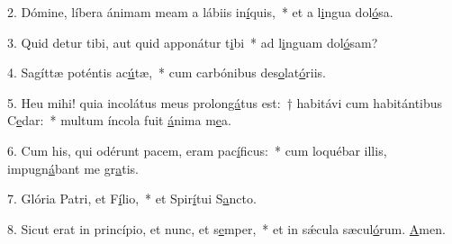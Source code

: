 2. Dómine, líbera ánimam meam a lábiis in\uline{í}quis,~* et a l\uline{i}ngua dol\uline{ó}sa.\par 
3. Quid detur tibi, aut quid apponátur t\uline{i}bi~* ad l\uline{i}nguam dol\uline{ó}sam?\par 
4. Sagíttæ poténtis ac\uline{ú}tæ,~* cum carbónibus des\uline{o}lat\uline{ó}riis.\par 
5. Heu mihi! quia incolátus meus prolon\uline{gá}tus est:~† habitávi cum habitántibus C\uline{e}dar:~* multum íncola fuit \uline{á}nima m\uline{e}a.\par 
6. Cum his, qui odérunt pacem, eram pac\uline{í}ficus:~* cum loquébar illis, impugn\uline{á}bant me gr\uline{a}tis.\par 
7. Glória Patri, et F\uline{í}lio,~* et Spir\uline{í}tui S\uline{a}ncto.\par 
8. Sicut erat in princípio, et nunc, et s\uline{e}mper,~* et in sǽcula sæcul\uline{ó}rum. \uline{A}men.\par 
